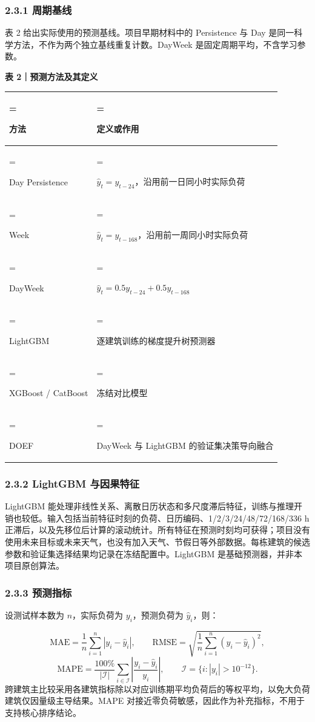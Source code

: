 \documentclass[12pt,a4paper]{article}
\begin{document}
\subsubsection{2.3.1 周期基线}
表 2 给出实际使用的预测基线。项目早期材料中的 Persistence 与 Day 是同一科学方法，不作为两个独立基线重复计数。DayWeek 是固定周期平均，不含学习参数。\par
\par\noindent\begin{minipage}{\linewidth}\textbf{表 2｜预测方法及其定义}\par\smallskip\renewcommand{\arraystretch}{1.2}\begin{tabularx}{\linewidth}{>{\hsize=0.65\hsize\linewidth=\hsize\raggedright\arraybackslash}X>{\hsize=1.35\hsize\linewidth=\hsize\raggedright\arraybackslash}X}\toprule
方法 & 定义或作用\\\midrule
Day Persistence & \(\hat{y}_t=y_{t-24}\)，沿用前一日同小时实际负荷\\
Week & \(\hat{y}_t=y_{t-168}\)，沿用前一周同小时实际负荷\\
DayWeek & \(\hat{y}_t=0.5y_{t-24}+0.5y_{t-168}\)\\
LightGBM & 逐建筑训练的梯度提升树预测器\\
XGBoost / CatBoost & 冻结对比模型\\
DOEF & DayWeek 与 LightGBM 的验证集决策导向融合\\
\bottomrule\end{tabularx}\end{minipage}\par
\subsubsection{2.3.2 LightGBM 与因果特征}
LightGBM 能处理非线性关系、离散日历状态和多尺度滞后特征，训练与推理开销也较低。输入包括当前特征时刻的负荷、日历编码、1/2/3/24/48/72/168/336 h 正滞后，以及先移位后计算的滚动统计。所有特征在预测时刻均可获得；项目没有使用未来目标或未来天气，也没有加入天气、节假日等外部数据。每栋建筑的候选参数和验证集选择结果均记录在冻结配置中。LightGBM 是基础预测器，并非本项目原创算法。\par
\subsubsection{2.3.3 预测指标}
设测试样本数为 \(n\)，实际负荷为 \(y_i\)，预测负荷为 \(\hat{y}_i\)，则：\par
\[
\mathrm{MAE}=\frac{1}{n}\sum_{i=1}^{n}|y_i-\hat{y}_i|,
\qquad
\mathrm{RMSE}=\sqrt{\frac{1}{n}\sum_{i=1}^{n}(y_i-\hat{y}_i)^2},
\]
\[
\mathrm{MAPE}=\frac{100\%}{|\mathcal I|}\sum_{i\in\mathcal I}\left|\frac{y_i-\hat{y}_i}{y_i}\right|,
\qquad \mathcal I=\{i:|y_i|>10^{-12}\}.
\]
跨建筑主比较采用各建筑指标除以对应训练期平均负荷后的等权平均，以免大负荷建筑仅因量级主导结果。MAPE 对接近零负荷敏感，因此作为补充指标，不用于支持核心排序结论。\par
\end{document}
